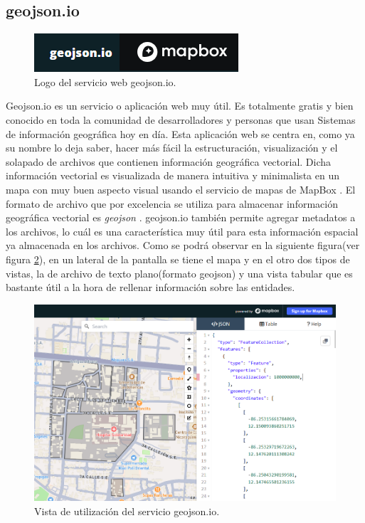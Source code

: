 \subsection{geojson.io}
\begin{figure}[h]
    \centering
    \includegraphics[scale=1.5]{Graphics/geojson.io_logo.png}
    \caption{Logo del servicio web geojson.io.}
    \label{fig:figura3}
\end{figure}
Geojson.io \cite*{geojson.io} es un servicio o aplicación web muy útil. Es totalmente gratis y bien conocido en toda la comunidad
de desarrolladores y personas que usan Sistemas de información geográfica hoy en día.
Esta aplicación web se centra en, como ya su
nombre lo deja saber, hacer más fácil la estructuración, visualización y el solapado de archivos que contienen información geográfica vectorial.
Dicha información vectorial es visualizada de manera intuitiva y minimalista en un mapa con muy buen aspecto visual usando el servicio
de mapas de MapBox \cite{mapbox}. El formato de archivo que por excelencia se utiliza para almacenar información geográfica vectorial es \textit{geojson} \cite*{geojsonOfficialPage}.
geojson.io también permite agregar metadatos a los archivos, lo cuál es una característica muy útil para esta información espacial ya almacenada en los archivos.
Como se podrá observar en la siguiente figura(ver figura \ref{fig:figura4}), en un lateral de la pantalla se tiene el mapa y en el otro dos tipos de vistas, la de archivo de texto plano(formato geojson)
y una vista tabular que es bastante útil a la hora de rellenar información sobre las entidades.
\begin{figure}[h]
    \centering
    \includegraphics[scale=0.5]{Graphics/geojson.io_description.png}
    \caption{Vista de utilización del servicio geojson.io.}
    \label{fig:figura4}
\end{figure}
